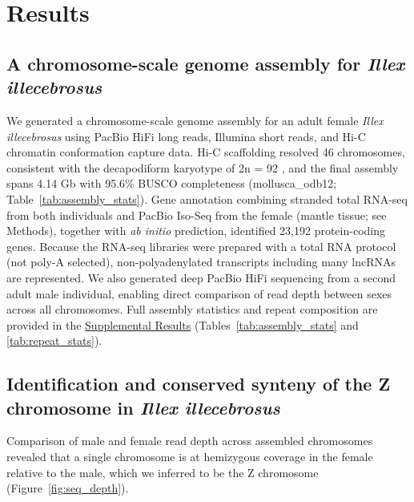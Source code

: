\documentclass[12pt]{article}
\newcommand{\citep}{\parencite}
\newcommand{\illex}{\textit{Illex illecebrosus}\xspace}
\begin{document}
\section*{Results}
\subsection*{A chromosome-scale genome assembly for \textit{Illex illecebrosus}}
We generated a chromosome-scale genome assembly for an adult female \illex
using PacBio HiFi long reads, Illumina short reads, and Hi-C chromatin conformation capture data.
Hi-C scaffolding resolved 46 chromosomes,
consistent with the decapodiform karyotype of 2n = 92 \citep{gao1990karyological},
and the final assembly spans 4.14 Gb with 95.6\% BUSCO completeness
(mollusca\_odb12; Table~\ref{tab:assembly_stats}).
Gene annotation combining stranded total RNA-seq from both individuals
and PacBio Iso-Seq from the female (mantle tissue; see Methods),
together with \textit{ab initio} prediction, identified 23,192 protein-coding genes.
Because the RNA-seq libraries were prepared with a total RNA protocol (not poly-A selected),
non-polyadenylated transcripts including many lncRNAs are represented.
We also generated deep PacBio HiFi sequencing from a second adult male individual,
enabling direct comparison of read depth between sexes across all chromosomes.
Full assembly statistics and repeat composition are provided in the
\hyperref[sec:supp_assembly]{Supplemental Results}
(Tables~\ref{tab:assembly_stats} and \ref{tab:repeat_stats}).

\subsection*{Identification and conserved synteny of the Z chromosome in \illex}
Comparison of male and female read depth across assembled chromosomes
revealed that a single chromosome is at hemizygous coverage
in the female relative to the male, which we inferred to be the Z chromosome (Figure~\ref{fig:seq_depth}).
\end{document}

